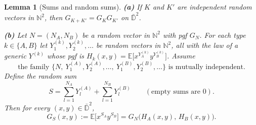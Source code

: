 \documentclass[11pt]{article}
\newtheorem{lemma}[theorem]{Lemma}
\theoremstyle{definition}
\theoremstyle{remark}
\newcommand{\E}{\mathbb{E}}
\begin{document}
\begin{lemma}[Sums and random sums]\label{lem:sums}
\textbf{(a)} If $K$ and $K'$ are independent random vectors in $\mathbb N^2$, then $G_{K+K'}=G_KG_{K'}$ on $\bar{\mathbb D}^2$.

\textbf{(b)} Let $N=(N_A,N_B)$ be a random vector in $\mathbb N^2$ with pgf $G_N$. For each type $k\in\{A,B\}$ let $Y^{(k)}_1,Y^{(k)}_2,\dots$ be random vectors in $\mathbb N^2$, all with the law of a generic $Y^{(k)}$ whose pgf is $H_k(x,y)=\E\big[x^{Y^{(k)}_A}y^{Y^{(k)}_B}\big]$. Assume
\begin{equation}\label{eq:indep}
\text{the family }\{N,\ Y^{(A)}_1,Y^{(A)}_2,\dots,\ Y^{(B)}_1,Y^{(B)}_2,\dots\}\text{ is mutually independent.}
\end{equation}
Define the random sum
\[
S=\sum_{l=1}^{N_A}Y^{(A)}_l+\sum_{l=1}^{N_B}Y^{(B)}_l\qquad(\text{empty sums are }0).
\]
Then for every $(x,y)\in\bar{\mathbb D}^2$,
\[
G_S(x,y):=\E\big[x^{S_A}y^{S_B}\big]=G_N\big(H_A(x,y),\,H_B(x,y)\big).
\]
\end{lemma}
\end{document}
